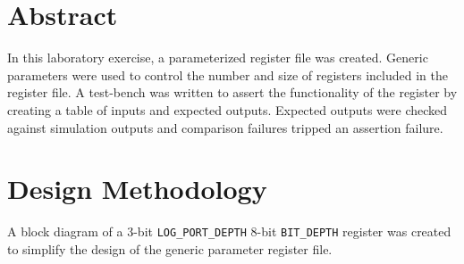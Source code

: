 \documentclass[CMPE]{../KGCOEReport}
\def\code#1{\texttt{#1}}
\begin{document}
    \maketitle
    \section*{Abstract}

    In this laboratory exercise, a parameterized register file was created.
    Generic parameters were used to control the number and size of registers
    included in the register file.
    A test-bench was written to assert the functionality of the register by
    creating a table of inputs and expected outputs.
    Expected outputs were checked against simulation outputs and comparison
    failures tripped an assertion failure.

    \section*{Design Methodology}
    
    A block diagram of a 3-bit \code{LOG\_PORT\_DEPTH} 8-bit \code{BIT\_DEPTH}
    register was created to simplify the design of the generic parameter
    register file.
\end{document}

